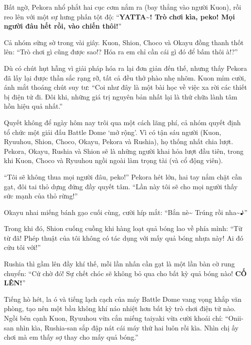\documentclass[../main.tex]{subfiles}
\begin{document}
Bất ngờ, Pekora nhổ phắt hai cục cơm nắm ra (bay thẳng vào người Kuon), rồi reo lên với một sự hưng phấn tột độ: ``\textbf{YATTA\~{}! Trò chơi kìa, peko! Mọi người đâu hết rồi, vào chiến thôi!}''


Cả nhóm sững sờ trong vài giây. Kuon, Shion, Choco và Okayu đồng thanh thốt lên: ``Trò chơi gì cũng được sao!? Hóa ra em chỉ cần cái gì đó để bấm thôi à!?''

Dù có chút hụt hẫng vì giải pháp hóa ra lại đơn giản đến thế, nhưng thấy Pekora đã lấy lại được thần sắc rạng rỡ, tất cả đều thở phào nhẹ nhõm. Kuon mỉm cười, ánh mắt thoáng chút suy tư: ``Coi như đây là một bài học về việc xa rời các thiết bị điện tử đi. Đôi khi, những giá trị nguyên bản nhất lại là thứ chữa lành tâm hồn hiệu quả nhất.''

\omk

Quyết không để ngày hôm nay trôi qua một cách lãng phí, cả nhóm quyết định tổ chức một giải đấu Battle Dome `mở rộng'. Vì có tận sáu người (Kuon, Ryuuhou, Shion, Choco, Okayu, Pekora và Rushia), họ thống nhất chia lượt. Pekora, Okayu, Rushia và Shion sẽ là những người khai hỏa lượt đầu tiên, trong khi Kuon, Choco và Ryuuhou ngồi ngoài làm trọng tài (và cổ động viên).


``Tôi sẽ không thua mọi người đâu, peko!'' Pekora hét lớn, hai tay nắm chặt cần gạt, đôi tai thỏ dựng đứng đầy quyết tâm. ``Lần này tôi sẽ cho mọi người thấy sức mạnh của thỏ rừng!''

Okayu nhai miếng bánh gạo cuối cùng, cười híp mắt: ``Bắn nè\~{} Trúng rồi nha\~{}♪''

Trong khi đó, Shion cuống cuồng khi hàng loạt quả bóng lao về phía mình: ``Từ từ đã! Phép thuật của tôi không có tác dụng với mấy quả bóng nhựa này! Ai đó cứu tôi với!''

Rushia thì gầm lên đầy khí thế, mỗi lần nhấn cần gạt là một lần bàn cờ rung chuyển: ``Cứ chờ đó! Sự chết chóc sẽ không bỏ qua cho bất kỳ quả bóng nào! \textbf{CỐ LÊN!}''

Tiếng hò hét, la ó và tiếng lạch cạch của máy Battle Dome vang vọng khắp văn phòng, tạo nên một bầu không khí náo nhiệt hơn bất kỳ trò chơi điện tử nào. Ngồi bên cạnh Kuon, Ryuuhou vừa cắn miếng taiyaki vừa cười khoái chí: ``Onii-san nhìn kìa, Rushia-san sắp đập nát cái máy thứ hai luôn rồi kìa. Nhìn chị ấy chơi mà em thấy sợ thay cho mấy quả bóng.''
\end{document}
